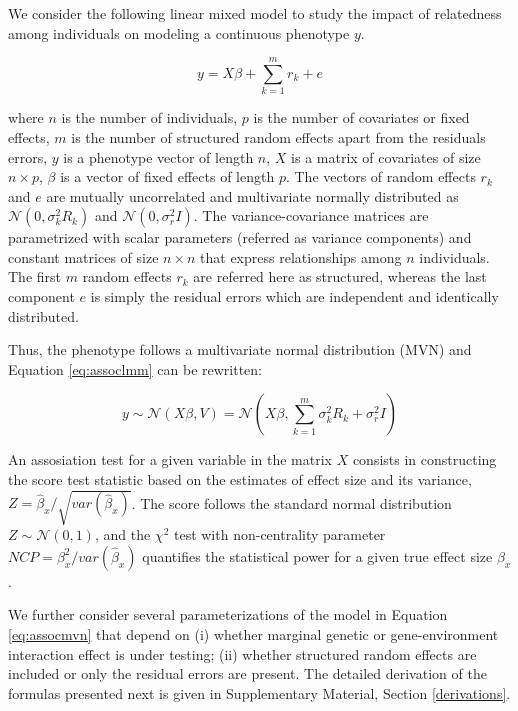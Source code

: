 \documentclass[]{book}
\begin{document}
We consider the following linear mixed model to study the impact of
relatedness among individuals on modeling a continuous phenotype \(y\).

\begin{equation}
  y = X \beta + \sum_{k=1}^{m}{r_k} + e
\label{eq:assoclmm}
\end{equation}

where \(n\) is the number of individuals, \(p\) is the number of
covariates or fixed effects, \(m\) is the number of structured random
effects apart from the residuals errors, \(y\) is a phenotype vector of
length \(n\), \(X\) is a matrix of covariates of size \(n \times p\),
\(\beta\) is a vector of fixed effects of length \(p\). The vectors of
random effects \(r_k\) and \(e\) are mutually uncorrelated and
multivariate normally distributed as \(\mathcal{N}(0, \sigma^2_k R_k)\)
and \(\mathcal{N}(0, \sigma^2_r I)\). The variance-covariance matrices
are parametrized with scalar parameters (referred as variance
components) and constant matrices of size \(n \times n\) that express
relationships among \(n\) individuals. The first \(m\) random effects
\(r_k\) are referred here as structured, whereas the last component
\(e\) is simply the residual errors which are independent and
identically distributed.

Thus, the phenotype follows a multivariate normal distribution (MVN) and
Equation \eqref{eq:assoclmm} can be rewritten:

\begin{equation}
  y \sim \mathcal{N} (X \beta, V) = \mathcal{N} (X \beta, \sum_{k=1}^{m}{\sigma_k^2 R_k} + \sigma_r^2 I) 
\label{eq:assocmvn}
\end{equation}

An assosiation test for a given variable in the matrix \(X\) consists in
constructing the score test statistic based on the estimates of effect
size and its variance,
\(Z = \hat{\beta}_x / \sqrt{var(\hat{\beta}_x)}\). The score follows the
standard normal distribution \(Z \sim \mathcal{N}(0, 1)\), and the
\(\chi^2\) test with non-centrality parameter
\(NCP = \beta^2_x / var(\hat{\beta}_x)\) quantifies the statistical
power for a given true effect size \(\beta_x\).

We further consider several parameterizations of the model in Equation
\eqref{eq:assocmvn} that depend on (i) whether marginal genetic or
gene-environment interaction effect is under testing; (ii) whether
structured random effects are included or only the residual errors are
present. The detailed derivation of the formulas presented next is given
in Supplementary Material, Section \ref{derivations}.
\end{document}
